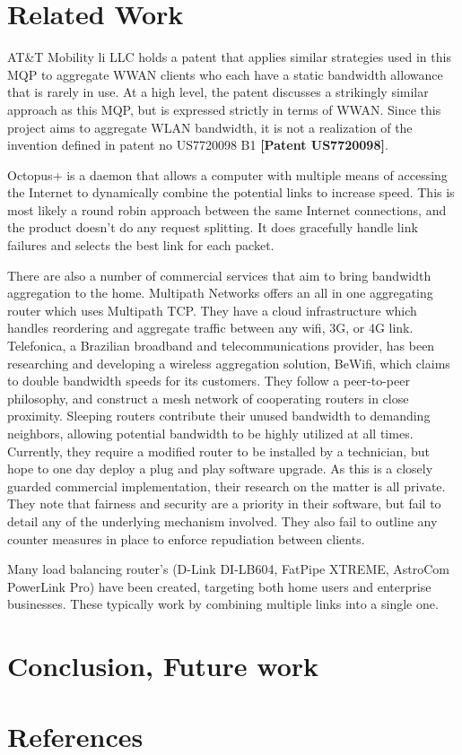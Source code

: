 \documentclass[12pt]{article}
\newcommand{\lcite}[1]
{{\bfseries\color{orange}[#1]}}
\begin{document}
\newpage
\section{Related Work}

		AT\&T Mobility li LLC holds a patent that applies similar strategies used in this MQP to aggregate WWAN clients who each have a static bandwidth allowance that is rarely in use. At a high level, the patent discusses a strikingly similar approach as this MQP, but is expressed strictly in terms of WWAN. Since this project aims to aggregate WLAN bandwidth, it is not a realization of the invention defined in patent no US7720098 B1 \lcite{Patent US7720098}.
		
		Octopus+ is a daemon that allows a computer with multiple means of accessing the Internet to dynamically combine the potential links to increase speed. This is most likely a round robin approach between the same Internet connections, and the product doesn't do any request splitting. It does gracefully handle link failures and selects the best link for each packet.
		
		There are also a number of commercial services that aim to bring bandwidth aggregation to the home. Multipath Networks offers an all in one aggregating router which uses Multipath TCP. They have a cloud infrastructure which handles reordering and aggregate traffic between any wifi, 3G, or 4G link. Telefonica, a Brazilian broadband and telecommunications provider, has been researching and developing a wireless aggregation solution, BeWifi, which claims to double bandwidth speeds for its customers. They follow a peer-to-peer philosophy, and construct a mesh network of cooperating routers in close proximity. Sleeping routers contribute their unused bandwidth to demanding neighbors, allowing potential bandwidth to be highly utilized at all times. Currently, they require a modified router to be installed by a technician, but hope to one day deploy a plug and play software upgrade. As this is a closely guarded commercial implementation, their research on the matter is all private. They note that fairness and security are a priority in their software, but fail to detail any of the underlying mechanism involved. They also fail to outline any counter measures in place to enforce repudiation between clients. 
		
		Many load balancing router's (D-Link DI-LB604, FatPipe XTREME, AstroCom PowerLink Pro) have been created, targeting both home users and enterprise businesses. These typically work by combining multiple links into a single one. 




\newpage
\section{Conclusion, Future work}


\newpage
\section{References}
\printbibliography
\end{document}
